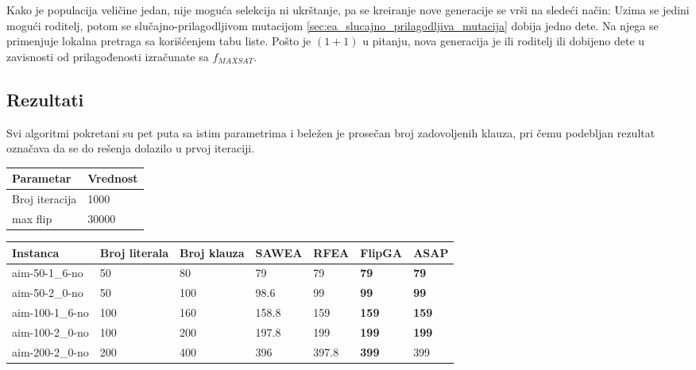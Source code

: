 \documentclass{article}
\begin{document}
Kako je populacija veličine jedan, nije moguća selekcija ni ukrštanje, 
pa se kreiranje nove generacije se vrši na sledeći način: 
Uzima se jedini mogući roditelj, potom se slučajno-prilagodljivom mutacijom
\ref{sec:ea_slucajno_prilagodljiva_mutacija} dobija jedno dete. 
Na njega se primenjuje lokalna pretraga sa korišćenjem tabu liste.
Pošto je $(1+1)$ u pitanju, nova generacija je ili roditelj ili dobijeno dete 
u zavisnosti od prilagođenosti izračunate sa $f_{MAXSAT}$.



\subsection{Rezultati}
\label{sec:ea_rezultati}
Svi algoritmi pokretani su pet puta sa istim parametrima i beležen je prosečan broj zadovoljenih klauza, pri čemu podebljan rezultat označava da se do rešenja dolazilo u prvoj iteraciji. \\

\begin{table}[h!]
\centering
{}\label{tab:ea_parametri} 
\begin{tabular}{ |p{3cm}|p{2cm}| }
 \hline
 Parametar 	& Vrednost \\ \hline
 Broj iteracija & 1000 \\ \hline
 max flip & 30000 \\  \hline
\end{tabular}
\end{table}


\begin{table}[h!]
\centering
{}\label{tab:ea_UNSAT}
\begin{tabular}{ |p{3cm}|p{1.6cm}|p{1.6cm}||p{1.6cm}|p{1.6cm}|p{1.6cm}|p{1.6cm}|} \hline
 Instanca & Broj \break literala & Broj \break klauza & SAWEA & RFEA & FlipGA & ASAP \\ \hline
 aim-50-1\_6-no & 50 & 80 & 79 & 79 & \textbf{79} & \textbf{79} \\ \hline
 aim-50-2\_0-no & 50 & 100 & 98.6 &  99 & \textbf{99} & \textbf{99} \\ \hline
 aim-100-1\_6-no & 100 & 160 & 158.8 & 159 & \textbf{159} & \textbf{159} \\ \hline
 aim-100-2\_0-no & 100 & 200 & 197.8 & 199 & \textbf{199} & \textbf{199} \\ \hline
 aim-200-2\_0-no & 200 & 400 & 396 & 397.8 & \textbf{399} & 399 \\ \hline
\end{tabular}
\end{table}
\end{document}
